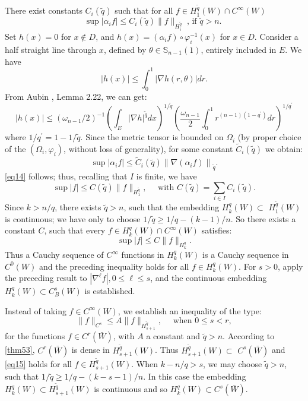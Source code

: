 \documentclass[12pt,hyperref,a4paper,UTF8]{ctexart}
\begin{document}
\begin{Proofa}
There exist constants $C_i(\tilde{q})$ such that for all $f \in H_1^{\tilde{q}}(W) \cap C^{\infty}(W)$
    \begin{equation}
    \sup \left|\alpha_i f\right| \leq C_i(\tilde{q})\|f\|_{H_i^{\tilde{q}}} \;\text {, if } \tilde{q}>n \text {. }
    \label{eq14}
\end{equation}
Set $h(x)=0$ for $x \notin D$, and $h(x)=\left(\alpha_i f\right) \circ \varphi_i^{-1}(x)$ for $x \in D$.
Consider a half straight line through $x$, defined by $\theta \in \mathbb{S}_{n-1}(1)$, entirely included in $E$. We have
$$
|h(x)| \leq \int_0^1|\nabla h(r, \theta)| d r .
$$
From Aubin \cite{Aubin}, Lemma 2.22, we can get: 
$$
|h(x)| \leq\left(\omega_{n-1} / 2\right)^{-1}\left(\int_E|\nabla h|^{\tilde{q}} d x\right)^{1 / \tilde{q}}\left(\frac{\omega_{n-1}}{2} \int_0^1 r^{(n-1)\left(1-q^{\prime}\right)} d r\right)^{1 / q^{\prime}}
$$
where $1 / q^{\prime}=1-1 / \tilde{q}$.
Since the metric tensor is bounded on $\Omega_i$ (by proper choice of the $\left(\Omega_i, \varphi_i\right)$, without loss of generality), for some constant $\widetilde{C}_i(\tilde{q})$ we obtain:
$$
\sup \left|\alpha_i f\right| \leq \tilde{C}_i(\tilde{q})\left\|\nabla\left(\alpha_i f\right)\right\|_{\tilde{q}} .
$$
\autoref{eq14} follows; thus, recalling that $I$ is finite, we have
$$
\sup |f| \leq C(\tilde{q})\|f\|_{H_1^{\tilde{q}}}, \quad \text { with } C(\tilde{q})=\sum_{i \in I} C_i(\tilde{q}) .
$$
Since $k>n / q$, there exists $\tilde{q}>n$, such that the embedding $H_k^q(W) \subset$ $H_1^{\tilde{q}}(W)$ is continuous; we have only to choose $1 / \tilde{q} \geq 1 / q-(k-1) / n$. So there exists a constant $C$, such that every $f \in H_k^q(W) \cap C^{\infty}(W)$ satisfies:
$$
\sup |f| \leq C\|f\|_{H_k^q} .
$$
Thus a Cauchy sequence of $C^{\infty}$ functions in $H_k^q(W)$ is a Cauchy sequence in $C^0(W)$ and the preceding inequality holds for all $f \in H_k^q(W)$.
For $s>0$, apply the preceding result to $\left|\nabla^{\ell} f\right|, 0 \leq \ell \leq s$, and the continuous embedding $H_k^q(W) \subset C_B^s(W)$ is established.
\end{Proofa}

\vskip 10pt
\begin{Proofb}
    Instead of taking $f \in C^{\infty}(W)$, we establish an inequality of the type:
    \begin{equation}
    \|f\|_{{C}^s} \leq A\|f\|_{{H}_{s+1}^{\tilde{q}}}, \quad \text { when } 0 \leq s<r,
\label{eq15}    
\end{equation}
    for the functions $f \in C^r(\bar{W})$, with $A$ a constant and $\tilde{q}>n$. According to \autoref{thm53}, $C^r(\bar{W})$ is dense in $H_{s+1}^{\tilde{q}}(W)$. Thus $H_{s+1}^{\tilde{q}}(W) \subset$ $C^s(\bar{W})$ and \autoref{eq15} holds for all $f \in H_{s+1}^{\tilde{q}}(W)$. When $k-n / q>s$, we may choose $\tilde{q}>n$, such that $1 / \tilde{q} \geq 1 / q-(k-s-1) / n$. In this case the embedding $H_k^q(W) \subset H_{s+1}^{\tilde{q}}(W)$ is continuous and so $H_k^q(W) \subset C^s(\bar{W})$.
\end{Proofb}
\end{document}
